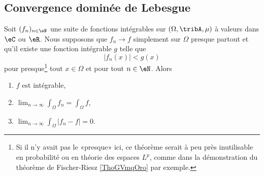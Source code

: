 \subsection{Convergence dominée de Lebesgue}

\begin{theorem}        \label{ThoConvDomLebVdhsTf}
    Soit \( (f_n)_{n\in\eN}\) une suite de fonctions intégrables sur \( (\Omega,\tribA,\mu)\) à valeurs dans \( \eC\) ou \( \eR\). Nous supposons que  \( f_n\to f\) simplement sur \( \Omega\) presque partout et qu'il existe une fonction intégrable \( g\) telle que
    \begin{equation}
        | f_n(x) |< g(x) 
    \end{equation}
    pour presque\footnote{Si il n'y avait pas le «presque» ici, ce théorème serait à peu près inutilisable en probabilité ou en théorie des espaces \( L^p\), comme dans la démonstration du théorème de Fischer-Riesz \ref{ThoGVmqOro} par exemple.} tout \( x\in\Omega\) et pour tout \( n\in \eN\). Alors
    \begin{enumerate}
        \item
            \( f\) est intégrable,
        \item
           $\lim_{n\to \infty} \int_{\Omega}f_n=\int_\Omega f$,
        \item
            $\lim_{n\to \infty} \int_{\Omega}| f_n-f |=0$.
    \end{enumerate}
\end{theorem}

